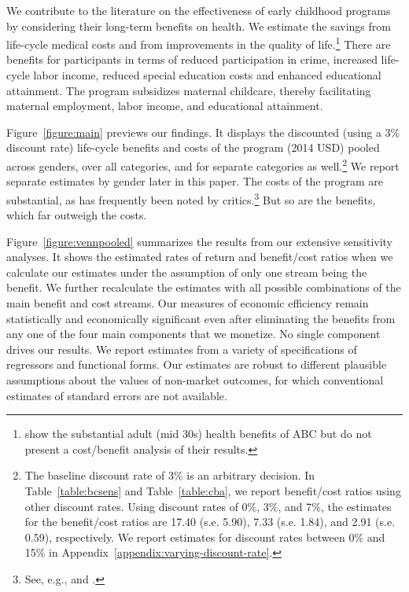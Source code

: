 We contribute to the literature on the effectiveness of early childhood programs by considering their long-term benefits on health. We estimate the savings from life-cycle medical costs and from improvements in the quality of life.\footnote{\cite{Campbell_Conti_etal_2014_EarlyChildhoodInvestments} show the substantial adult (mid 30s) health benefits of ABC but do not present a cost/benefit analysis of their results.} There are benefits for participants in terms of reduced participation in crime, increased life-cycle labor income, reduced special education costs and enhanced educational attainment. The program subsidizes maternal childcare, thereby facilitating maternal employment, labor income, and educational attainment.

Figure~\ref{figure:main} previews our findings. It displays the discounted (using a 3\% discount rate) life-cycle benefits and costs of the program (2014 USD) pooled across genders, over all categories, and for separate categories as well.\footnote{The baseline discount rate of 3\% is an arbitrary decision. In Table~\ref{table:bcsens} and Table~\ref{table:cba}, we report benefit/cost ratios using other discount rates. Using discount rates of 0\%, 3\%, and 7\%, the estimates for the benefit/cost ratios are 17.40 (s.e. 5.90), 7.33 (s.e. 1.84), and 2.91 (s.e. 0.59), respectively. We report estimates for discount rates between 0\% and 15\% in  Appendix~\ref{appendix:varying-discount-rate}.} We report separate estimates by gender later in this paper. The costs of the program are substantial, as has frequently been noted by critics.\footnote{See, e.g., \citet{Fox_News_2014_Head_Start_Effects} and \citet{Whitehurst_2014_Senate_Testimony}.} But so are the benefits, which far outweigh the costs.

Figure~\ref{figure:vennpooled} summarizes the results from our extensive sensitivity analyses. It shows the estimated rates of return and benefit/cost ratios when we calculate our estimates under the assumption of only one stream being the benefit. We further recalculate the estimates with all possible combinations of the main benefit and cost streams. Our measures of economic efficiency remain statistically and economically significant even after eliminating the benefits from any one of the four main components that we monetize. No single component drives our results. We report estimates from a variety of specifications of regressors and functional forms. Our estimates are robust to different plausible assumptions about the values of non-market outcomes, for which conventional estimates of standard errors are not available.

